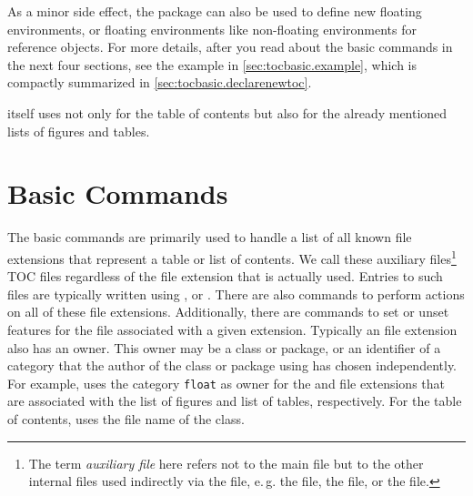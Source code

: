 As a minor side effect, the package can also be used to define new floating
environments, or floating environments like non-floating environments for
reference objects. For more details, after you read about the basic commands
in the next four sections, see the example in \autoref{sec:tocbasic.example},
which is compactly summarized in \autoref{sec:tocbasic.declarenewtoc}.

\KOMAScript{} itself uses  not only for the table of
contents but also for the already mentioned lists of figures and tables.

\section{Basic Commands}
\label{sec:tocbasic.basics}

The basic commands are primarily used to handle a list of all known file
extensions that represent a table or
list of contents. We call these auxiliary files\footnote{The term \emph{auxiliary file} here refers not to the main
   file but to the other internal files used indirectly via the
   file, e.\,g. the  file, the  file, or the
   file.} TOC files
regardless of the file extension that is actually used. Entries to such files
are typically written using
, or
. There are also commands to perform
actions on all of these file extensions. Additionally, there are commands to
set or unset features for the file associated with a given extension.
Typically an file extension also has an owner. This owner
may be a class or package, or an identifier of a category that the author of
the class or package using  has chosen independently. For
example, \KOMAScript{} uses the category \texttt{float} as owner for the
 and  file extensions that are associated with the list of
figures and list of tables, respectively. For the table of contents,
\KOMAScript{} uses the file name of the class.

